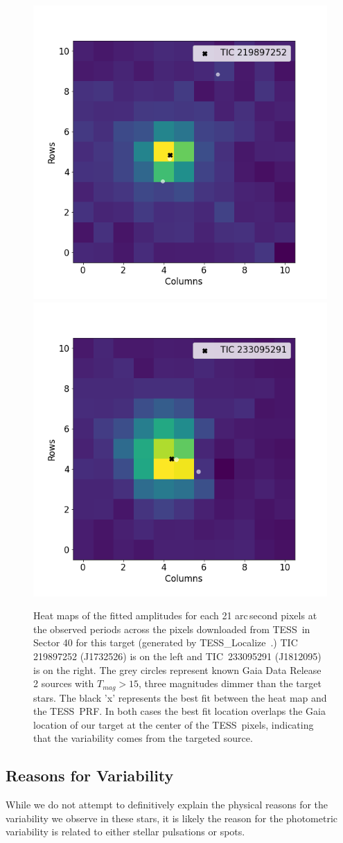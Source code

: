 \documentclass[twocolumn]{aastex631}
\newcommand{\tess}{TESS}
\newcommand{\tesslocalize}{{{\fontfamily{lmtt}\selectfont TESS\_Localize}}}
\begin{document}
\begin{figure}
\centering
\includegraphics[width=0.45\linewidth]{figures/TIC219897252_s040_5modes_tloc.png}
\includegraphics[width=0.45\linewidth]{figures/TIC233095291_s040_2modes_tloc.png}
\caption{Heat maps of the fitted amplitudes for each 21 arc\,second pixels at the observed periods across the pixels downloaded from \tess\ in Sector 40 for this target (generated by \tesslocalize\ .) TIC 219897252 (J1732526) is on the left and TIC~233095291 (J1812095) is on the right. The grey circles represent known Gaia Data Release 2 sources with $T_{mag} > 15$, three magnitudes dimmer than the target stars. The black 'x' represents the best fit between the heat map and the \tess\ PRF. In both cases the best fit location overlaps the Gaia location of our target at the center of the \tess\ pixels, indicating that the variability comes from the targeted source.} 
\label{fig:cent}
\end{figure}

\subsection{Reasons for Variability}

While we do not attempt to definitively explain the physical reasons for the variability we observe in these stars, it is likely the reason for the photometric variability is related to either stellar pulsations or spots. 
\end{document}
